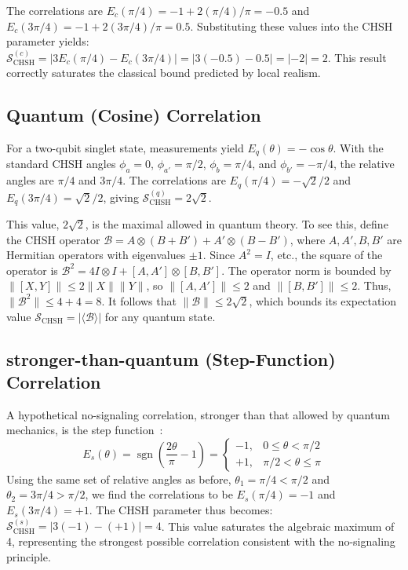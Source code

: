 \documentclass[%
  reprint,
  showpacs,
  showkeys,
  pra,
  longbibliography,
  floatfix,
  x11names
]{revtex4-2}
\begin{document}
The correlations are $E_c(\pi/4) = -1 + 2(\pi/4)/\pi = -0.5$ and $E_c(3\pi/4) = -1 + 2(3\pi/4)/\pi = 0.5$. Substituting these values into the CHSH parameter yields:
$\mathcal{S}_{\mathrm{CHSH}}^{(c)} = |3 E_c(\pi/4) - E_c(3\pi/4)| = |3(-0.5) - 0.5| = |-2| = 2$.
This result correctly saturates the classical bound predicted by local realism.

\subsection{Quantum (Cosine) Correlation}
For a two-qubit singlet state, measurements yield $E_q(\theta) = -\cos\theta$. With the standard CHSH angles $\phi_a=0$, $\phi_{a'}=\pi/2$, $\phi_b=\pi/4$, and $\phi_{b'}=-\pi/4$, the relative angles are $\pi/4$ and $3\pi/4$. The correlations are $E_q(\pi/4)=-\sqrt{2}/2$ and $E_q(3\pi/4)=\sqrt{2}/2$, giving $\mathcal{S}_{\mathrm{CHSH}}^{(q)} = 2\sqrt{2}$.

This value, $2\sqrt{2}$, is the maximal allowed in quantum theory. To see this, define the CHSH operator $\mathcal{B} = A\otimes(B+B') + A'\otimes(B-B')$, where $A, A', B, B'$ are Hermitian operators with eigenvalues $\pm1$. Since $A^2=I$, etc., the square of the operator is $\mathcal{B}^2 = 4I\otimes I + [A,A']\otimes[B,B']$. The operator norm is bounded by $\|[X,Y]\| \le 2\|X\|\|Y\|$, so $\|[A,A']\| \le 2$ and $\|[B,B']\| \le 2$. Thus, $\|\mathcal{B}^2\| \le 4+4=8$. It follows that $\|\mathcal{B}\| \le  2\sqrt{2}$, which bounds its expectation value $\mathcal{S}_{\mathrm{CHSH}}=|\langle\mathcal{B}\rangle|$ for any quantum state.

\subsection{stronger-than-quantum (Step-Function) Correlation}
A hypothetical no-signaling correlation, stronger than that allowed by quantum mechanics, is the step function~\cite{svozil-krenn,pop-rohr}:
\begin{equation}
E_s(\theta) =\operatorname{sgn}\!\left(\frac{2\theta}{\pi}-1\right)= \begin{cases} -1, & 0\le \theta<\pi/2 \\ +1, & \pi/2<\theta\le\pi \end{cases}
\end{equation}
Using the same set of relative angles as before, $\theta_1 = \pi/4 < \pi/2$ and $\theta_2 = 3\pi/4 > \pi/2$, we find the correlations to be $E_s(\pi/4)=-1$ and $E_s(3\pi/4)=+1$. The CHSH parameter thus becomes:
$\mathcal{S}_{\mathrm{CHSH}}^{(s)} = |3(-1) - (+1)| = 4$.
This value saturates the algebraic maximum of 4, representing the strongest possible correlation consistent with the no-signaling principle.
\end{document}
